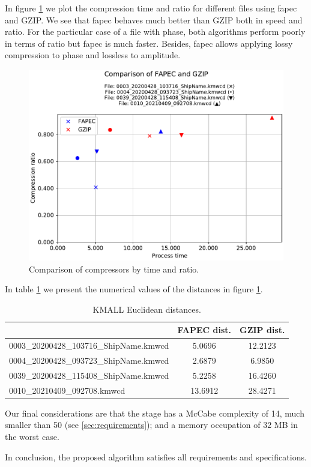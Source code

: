 In figure \ref{fig:kmall_compare} we plot the compression time and ratio for different files using \acrshort{fapec} and GZIP. We see that \acrshort{fapec} behaves much better than GZIP both in speed and ratio. For the particular case of a file with phase, both algorithms perform poorly in terms of ratio but \acrshort{fapec} is much faster. Besides, \acrshort{fapec} allows applying lossy compression to phase and lossless to amplitude.

\begin{figure}[h!]
	\begin{center}
		\includegraphics[scale=0.69]{images/2021-05-31T23:59:08.498586-results_kmall.csv_comparison.pdf}
	\end{center}
	\caption{Comparison of compressors by time and ratio.}
	\label{fig:kmall_compare}
\end{figure}

In table \ref{tab:kmall_compare} we present the numerical values of the distances in figure \ref{fig:kmall_compare}.

\begin{table}[h!]
\normalsize
\centering
\begin{tabular}{|l|c|c|}
	\hline
	\rowcolor[HTML]{9698ED} 
	\multicolumn{1}{|c|}{\cellcolor[HTML]{9698ED}Filename}         & FAPEC dist. & GZIP dist. \\ \hline
	\cellcolor[HTML]{FFFFFF}0003\_20200428\_103716\_ShipName.kmwcd & 5.0696      & 12.2123    \\ \hline
	\cellcolor[HTML]{FFFFFF}0004\_20200428\_093723\_ShipName.kmwcd & 2.6879      & 6.9850     \\ \hline
	\cellcolor[HTML]{FFFFFF}0039\_20200428\_115408\_ShipName.kmwcd & 5.2258      & 16.4260    \\ \hline
	0010\_20210409\_092708.kmwcd                                   & 13.6912     & 28.4271    \\ \hline
\end{tabular}
\caption{KMALL Euclidean distances.}
\label{tab:kmall_compare}
\end{table}

Our final considerations are that the stage has a McCabe complexity of 14, much smaller than 50 (see \ref{sec:requirements}); and a memory occupation of 32 MB in the worst case.

In conclusion, the proposed algorithm satisfies all requirements and specifications.